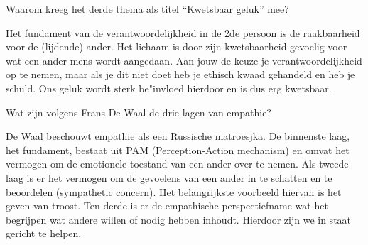 \documentclass[main.tex]{subfiles}
\begin{document}
\begin{examenvraag}
    \begin{vraag}
        Waarom kreeg het derde thema als titel “Kwetsbaar geluk” mee?
    \end{vraag}

    \begin{antwoord}
	    Het fundament van de verantwoordelijkheid in de 2de persoon is de raakbaarheid voor de (lijdende) ander. Het lichaam is door zijn kwetsbaarheid gevoelig voor wat een ander mens wordt aangedaan. Aan jouw de keuze je verantwoordelijkheid op te nemen, maar als je dit niet doet heb je ethisch kwaad gehandeld en heb je schuld. Ons geluk wordt sterk be"invloed hierdoor en is dus erg kwetsbaar.
    \end{antwoord}
\end{examenvraag}


\begin{examenvraag}
    \begin{vraag}
        Wat zijn volgens Frans De Waal de drie lagen van empathie?
    \end{vraag}

    \begin{antwoord}
    De Waal beschouwt empathie als een Russische matroesjka.‭ ‬De binnenste laag,‭ ‬het fundament,‭ 
    ‬bestaat uit PAM‭ (‬Perception-Action mechanism‭) ‬en omvat het vermogen om de emotionele toestand 
    van een ander over te nemen.‭ ‬Als tweede laag is er het vermogen om de gevoelens van een ander 
    in‭ ‬te schatten en te beoordelen (sympathetic concern).‭ ‬Het belangrijkste voorbeeld hiervan is het geven van troost.‭ 
    ‬Ten derde is er de empathische perspectiefname wat het begrijpen wat andere willen of nodig 
    hebben inhoudt.‭ ‬Hierdoor zijn we in staat gericht te helpen.
    \end{antwoord}
\end{examenvraag}
\end{document}
